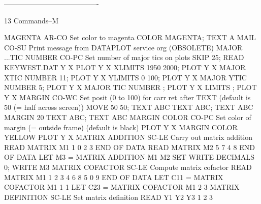 ----------------------------------------
 
13
Commands--M
 
MAGENTA                     AR-CO Set color to magenta
                                  COLOR MAGENTA; TEXT A
MAIL                        CO-SU Print message from DATAPLOT service org
                                  (OBSOLETE)
MAJOR ...TIC NUMBER         CO-PC Set number of major tics on plots
                                  SKIP 25; READ KEYWEST.DAT Y X
                                  PLOT Y X
                                  XLIMITS 1950 2000; PLOT Y X
                                  MAJOR XTIC NUMBER 11; PLOT Y X
                                  YLIMITS 0 100; PLOT Y X
                                  MAJOR YTIC NUMBER 5; PLOT Y X
                                  MAJOR TIC NUMBER ; PLOT Y X
                                  LIMITS ; PLOT Y X
MARGIN                      CO-WC Set posit (0 to 100) for carr ret after TEXT
                                  (default is 50 (= half across screen))
                                  MOVE 50 50; TEXT ABC
                                  TEXT ABC; TEXT ABC
                                  MARGIN 20
                                  TEXT ABC; TEXT ABC
MARGIN COLOR                CO-PC Set color of margin (= outside frame)
                                  (default is black)
                                  PLOT Y X
                                  MARGIN COLOR YELLOW
                                  PLOT Y X
MATRIX ADDITION             SC-LE Carry out matrix addition
                                  READ MATRIX M1
                                  1 0
                                  2 3
                                  END OF DATA
                                  READ MATRIX M2
                                  5 7
                                  4 8
                                  END OF DATA
                                  LET M3 = MATRIX ADDITION M1 M2
                                  SET WRITE DECIMALS 0; WRITE M3
MATRIX COFACTOR             SC-LE Compute matrix cofactor
                                  READ MATRIX M1
                                  1 2 3
                                  4 6 8
                                  5 0 9
                                  END OF DATA
                                  LET C11 = MATRIX COFACTOR M1 1 1
                                  LET C23 = MATRIX COFACTOR M1 2 3
MATRIX DEFINITION           SC-LE Set matrix definition
                                  READ Y1 Y2 Y3
                                  1 2 3
